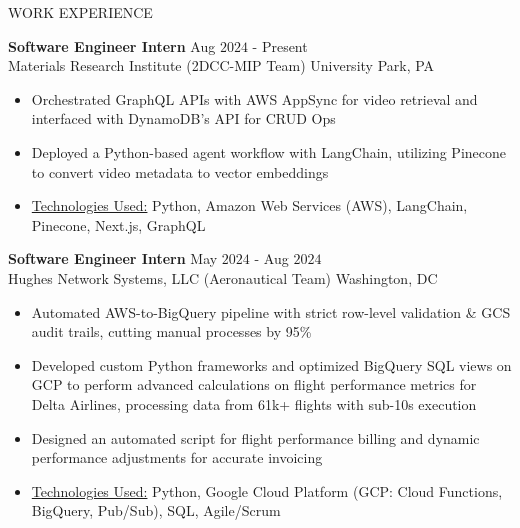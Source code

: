 \documentclass{resume} %
\begin{document}
\begin{rSection}{WORK EXPERIENCE}

{\bf Software Engineer Intern} \hfill Aug $2024$ - Present\\
Materials Research Institute (2DCC-MIP Team) \hfill University Park, PA
\begin{itemize}[itemsep = -4pt]
    \item Orchestrated GraphQL APIs with AWS AppSync for video retrieval and interfaced with DynamoDB's API for CRUD Ops
    \item Deployed a Python-based agent workflow with LangChain, utilizing Pinecone to convert video metadata to vector embeddings
    \item \underline{Technologies Used:} Python, Amazon Web Services (AWS), LangChain, Pinecone, Next.js, GraphQL
\end{itemize}

{\bf Software Engineer Intern} \hfill May $2024$ - Aug $2024$\\
Hughes Network Systems, LLC (Aeronautical Team) \hfill Washington, DC
\begin{itemize}[itemsep = -4pt]
    \item Automated AWS-to-BigQuery pipeline with strict row-level validation \& GCS audit trails, cutting manual processes by 95\%
    \item Developed custom Python frameworks and optimized BigQuery SQL views on GCP to perform advanced calculations on flight performance metrics for Delta Airlines, processing data from 61k+ flights with sub-10s execution
    \item Designed an automated script for flight performance billing and dynamic performance adjustments for accurate invoicing
    \item \underline{Technologies Used:} Python, Google Cloud Platform (GCP: Cloud Functions, BigQuery, Pub/Sub), SQL, Agile/Scrum
\end{itemize}


\end{rSection}
\end{document}
